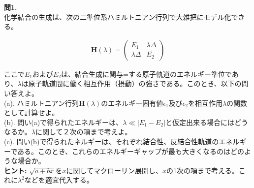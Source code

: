 \documentclass{jlreq}
\begin{document}
\noindent
\textbf{問1.}\\

\noindent
化学結合の生成は、次の二準位系ハミルトニアン行列で大雑把にモデル化できる。

\begin{eqnarray}
\mathbf{H}(\lambda)=
\begin{pmatrix}
E_1 & \lambda\Delta \\ 
\lambda\Delta & E_2
\end{pmatrix}
\end{eqnarray}

ここで$E_1$および$E_2$は、結合生成に関与=する原子軌道のエネルギー準位であり、$\lambda$は原子軌道間に働く相互作用（摂動）の強さである。このとき、以下の問い答えよ。\\

\noindent
(a). ハミルトニアン行列$\mathbf{H}(\lambda)$のエネルギー固有値$\epsilon_1$及び$\epsilon_2$を相互作用$\lambda$の関数として計算せよ。\\
\noindent
(b). 問い(a)で得られたエネルギーは、$\lambda \ll |E_1-E_2|$と仮定出来る場合にはどうなるか。$\lambda$に関して２次の項まで考えよ。\\
\noindent
(c). 問い(b)で得られたネルギーは、それぞれ結合性、反結合性軌道のエネルギーである。このとき、これらのエネルギーギャップが最も大きくなるのはどのような場合か。\\

\noindent
\textbf{ヒント:} $\sqrt{a+bx}$を$x$に関してマクローリン展開し、$x$の1次の項まで考える。これに$\lambda^2$などを適宜代入する。
\end{document}
